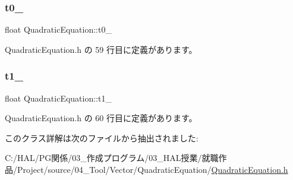 \mbox{\label{class_quadratic_equation_a102647b71fef766fdebc1e86f0d1e1c5}} 
\subsubsection{\texorpdfstring{t0\+\_\+}{t0\_}}
{\footnotesize\ttfamily float Quadratic\+Equation\+::t0\+\_\+}



 Quadratic\+Equation.\+h の 59 行目に定義があります。

\mbox{\label{class_quadratic_equation_a1a8b4074a16fccdc3d717b4baa9d133e}} 
\subsubsection{\texorpdfstring{t1\+\_\+}{t1\_}}
{\footnotesize\ttfamily float Quadratic\+Equation\+::t1\+\_\+}



 Quadratic\+Equation.\+h の 60 行目に定義があります。



このクラス詳解は次のファイルから抽出されました\+:\begin{DoxyCompactItemize}
\item 
C\+:/\+H\+A\+L/\+P\+G関係/03\+\_\+作成プログラム/03\+\_\+\+H\+A\+L授業/就職作品/\+Project/source/04\+\_\+\+Tool/\+Vector/\+Quadratic\+Equation/\mbox{\hyperlink{_quadratic_equation_8h}{Quadratic\+Equation.\+h}}\end{DoxyCompactItemize}
